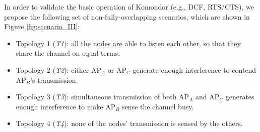 \documentclass[a4paper]{article}
\begin{document}
%
	In order to validate the basic operation of Komondor (e.g., DCF, RTS/CTS), we propose the following set of non-fully-overlapping scenarios, which are shown in Figure \ref{fig:scenario_III}:
	\begin{itemize}
		\item Topology 1 (\emph{T1}): all the nodes are able to listen each other, so that they share the channel on equal terms.
		\item Topology 2 (\emph{T2}): either $\text{AP}_A$ or $\text{AP}_C$ generate enough interference to contend $\text{AP}_B$'s transmission.
		\item Topology 3 (\emph{T3}): simultaneous transmission of both $\text{AP}_A$ and $\text{AP}_C$ generates enough interference to make $\text{AP}_B$ sense the channel busy.
		\item Topology 4 (\emph{T4}): none of the nodes' transmission is sensed by the others.
	\end{itemize}
	
\end{document}
